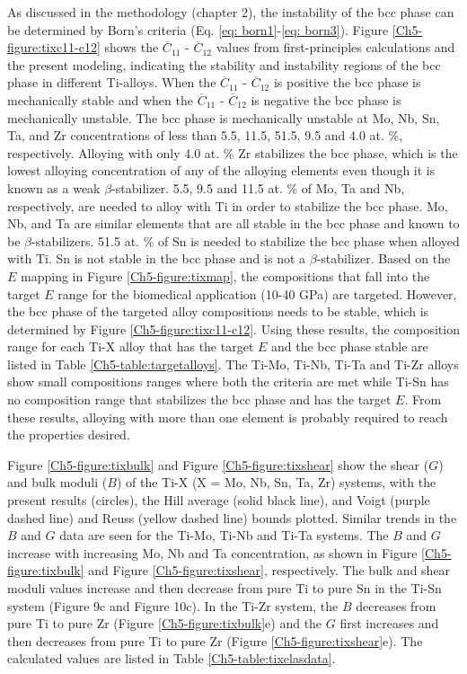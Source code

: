 As discussed in the methodology (chapter 2), the instability of the bcc phase can be determined by Born's criteria (Eq. \ref{eq: born1}-\ref{eq: born3}). Figure \ref{Ch5-figure:tixc11-c12} shows the $\overline{C}_{11}$ - $\overline{C}_{12}$ values from first-principles calculations and the present modeling, indicating the stability and instability regions of the bcc phase in different Ti-alloys. When the $\overline{C}_{11}$ - $\overline{C}_{12}$ is positive the bcc phase is mechanically stable and when the $\overline{C}_{11}$ - $\overline{C}_{12}$ is negative the bcc phase is mechanically unstable. The bcc phase is mechanically unstable at Mo, Nb, Sn, Ta, and Zr concentrations of less than 5.5, 11.5, 51.5, 9.5 and 4.0 at. \%, respectively. Alloying with only 4.0 at. \% Zr stabilizes the bcc phase, which is the lowest alloying concentration of any of the alloying elements even though it is known as a weak $\beta$-stabilizer. 5.5, 9.5 and 11.5 at. \% of Mo, Ta and Nb, respectively, are needed to alloy with Ti in order to stabilize the bcc phase. Mo, Nb, and Ta are similar elements that are all stable in the bcc phase and known to be $\beta$-stabilizers. 51.5 at. \% of Sn is needed to stabilize the bcc phase when alloyed with Ti. Sn is not stable in the bcc phase and is not a $\beta$-stabilizer. Based on the $E$ mapping in Figure \ref{Ch5-figure:tixmap}, the compositions that fall into the target $E$ range for the biomedical application (10-40 GPa) are targeted. However, the bcc phase of the targeted alloy compositions needs to be stable, which is determined by Figure \ref{Ch5-figure:tixc11-c12}. Using these results, the composition range for each Ti-X alloy that has the target $E$ and the bcc phase stable are listed in Table \ref{Ch5-table:targetalloys}. The Ti-Mo, Ti-Nb, Ti-Ta and Ti-Zr alloys show small compositions ranges where both the criteria are met while Ti-Sn has no composition range that stabilizes the bcc phase and has the target $E$. From these results, alloying with more than one element is probably required to reach the properties desired. 

Figure \ref{Ch5-figure:tixbulk} and Figure \ref{Ch5-figure:tixshear} show the shear ($G$) and bulk moduli ($B$) of the Ti-X (X = Mo, Nb, Sn, Ta, Zr) systems, with the present results (circles), the Hill average (solid black line), and Voigt (purple dashed line) and Reuss (yellow dashed line) bounds plotted. Similar trends in the $B$ and $G$ data are seen for the Ti-Mo, Ti-Nb and Ti-Ta systems. The $B$ and $G$ increase with increasing Mo, Nb and Ta concentration, as shown in Figure \ref{Ch5-figure:tixbulk} and Figure \ref{Ch5-figure:tixshear}, respectively. The bulk and shear moduli values increase and then decrease from pure Ti to pure Sn in the Ti-Sn system (Figure 9c and Figure 10c). In the Ti-Zr system, the $B$ decreases from pure Ti to pure Zr (Figure \ref{Ch5-figure:tixbulk}e) and the $G$ first increases and then decreases from pure Ti to pure Zr (Figure \ref{Ch5-figure:tixshear}e). The calculated values are listed in Table \ref{Ch5-table:tixelasdata}. 

